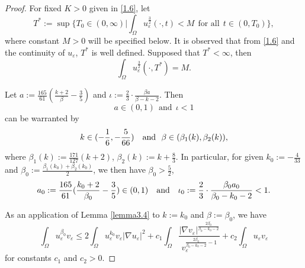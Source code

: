 \documentclass[10pt,a4paper]{amsart}
\begin{document}
\begin{proof}
For fixed $K>0$  given in \eqref{1.6}, %
let
$$T^*:=\sup\bigg\{T_0\in(0,\infty)|\int_\Omega u_\varepsilon^{\frac{3}{2}}(\cdot,t)<M~~\mbox{for all}~~t\in(0,T_0)\bigg\},$$
where constant $M>0$ will be specified below. It is observed that from \eqref{1.6} and the continuity of $u_\varepsilon$, $T^*$ is well defined.
Supposed that $T^*<\infty$,  then
$$ \int_\Omega u_\varepsilon^{\frac{3}{2}}(\cdot,T^*)=M.$$

Let
$    a:=\frac{165}{61}(\frac{k+2}{\beta}-\frac{3}{5})$ and $\iota:=\frac{2}{3}\cdot\frac{\beta a}{\beta-k-2}.
$
Then \begin{equation*}
   a\in(0,1)~~\mbox{and}~~ \iota<1
\end{equation*}
can be warranted by
\begin{equation*}
k\in(-\frac{1}{6},-\frac{5}{66}) ~~~\hbox{and}~~
\beta\in(\beta_1(k),\beta_2(k)),
\end{equation*}
where $\beta_1(k):=\frac{171}{127}(k+2)$,  $\beta_2(k):=k+\frac{8}{3}$. In particular,  for given  $k_0:=-\frac 4 {33}$ and $\beta_0:=\frac{\beta_1(k_0)+\beta_2(k_0)} 2$,  we then have $ \beta_0>\frac 52$,
 \begin{equation}\label{3.8}
a_0:=\frac{165}{61}(\frac{k_0+2}{\beta_0}-\frac{3}{5})\in(0,1)~~~\hbox{and}~~~
      \iota_0:=\frac{2}{3}\cdot\frac{\beta_0 a_0}{\beta_0-k_0-2}<1.
 \end{equation}

As an application of Lemma \ref{lemma3.4} to $k:=k_0$ and $\beta:=\beta_0$, we have
\begin{equation}\label{3.9}
 \int_\Omega u_\varepsilon^{\beta_0}v_\varepsilon\leq
 2\int_{\Omega}u_\varepsilon^{k_0}v_\varepsilon|\nabla u_\varepsilon|^2+c_1\int_\Omega\frac{|\nabla v_\varepsilon|^{\frac{2\beta_0}{\beta_0-k_0-2}}}{v_\varepsilon^{\frac{2\beta_0}{\beta_0-k_0-2}-1}}
 +c_2\int_{\Omega}u_\varepsilon v_\varepsilon
        \end{equation}
for constants  $c_1$ and $c_2>0$.


\end{proof}
\end{document}
